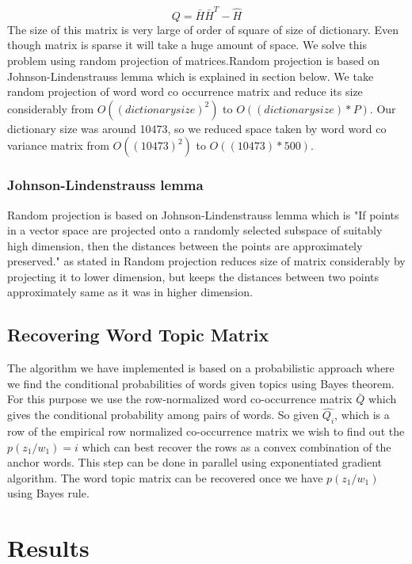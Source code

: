 \documentclass[a4paper,11pt]{article}
\begin{document}
\begin{equation}
Q = \bar{H} \bar{H}^T - \hat{H}
\end{equation}
The size of this matrix is very large of order of square of size of dictionary. Even though matrix is sparse it will take a huge amount of space. We solve this problem using random projection of matrices.Random projection is based on Johnson-Lindenstrauss lemma which is explained in section below. We take random projection of word word co occurrence matrix and reduce its size considerably from $O((dictionary size)^2)$ to $O((dictionary size)*P)$. Our dictionary size was around 10473, so we reduced space taken by word word co variance matrix from $O((10473)^2)$ to $O((10473)*500)$.

\subsubsection{Johnson-Lindenstrauss lemma}
Random projection is based on Johnson-Lindenstrauss lemma which is "If points in a vector space are projected onto a randomly selected subspace of suitably high dimension, then the distances between the points are approximately preserved." as stated in \cite{randomProjection} Random projection reduces size of matrix considerably by projecting it to lower dimension, but keeps the distances between two points approximately same as it was in higher dimension.


\subsection{Recovering Word Topic Matrix}
The algorithm we have implemented is based on a probabilistic approach where we find the conditional probabilities of words given topics using Bayes theorem. For this purpose we use the row-normalized word co-occurrence matrix $\bar{Q}$ which gives the conditional probability among pairs of words. So given $\hat{Q_{i}}$, which is a row of the empirical row normalized co-occurrence matrix we wish to find out the $p(z_{1}/w_{1})=i$ which can best recover the rows as a convex combination of the anchor words. This step can be done in parallel using exponentiated gradient algorithm. The word topic matrix can be recovered once we have $p(z_{1}/w_{1})$ using Bayes rule. 


\section{Results}
\end{document}
